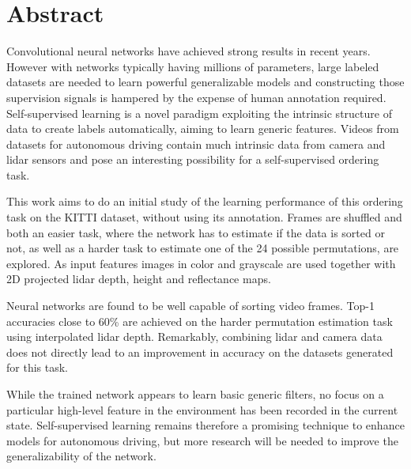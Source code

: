 %

\newpage
\vspace{3cm}

\chapter*{Abstract}
Convolutional neural networks have achieved strong results in recent years. However with networks typically having millions of parameters, large labeled datasets are needed to learn powerful generalizable models and constructing those supervision signals is hampered by the expense of human annotation required. Self-supervised learning is a novel paradigm exploiting the intrinsic structure of data to create labels automatically, aiming to learn generic features. Videos from datasets for autonomous driving contain much intrinsic data from camera and lidar sensors and pose an interesting possibility for a self-supervised ordering task. 

This work aims to do an initial study of the learning performance of this ordering task on the KITTI dataset, without using its annotation. Frames are shuffled and both an easier task, where the network has to estimate if the data is sorted or not, as well as a harder task to estimate one of the 24 possible permutations, are explored. As input features images in color and grayscale are used together with 2D projected lidar depth, height and reflectance maps.

Neural networks are found to be well capable of sorting video frames. Top-1 accuracies close to 60\% are achieved on the harder permutation estimation task using interpolated lidar depth. Remarkably, combining lidar and camera data does not directly lead to an improvement in accuracy on the datasets generated for this task. 

While the trained network appears to learn basic generic filters, no focus on a particular high-level feature in the environment has been recorded in the current state. Self-supervised learning remains therefore a promising technique to enhance models for autonomous driving, but more research will be needed to improve the generalizability of the network.


